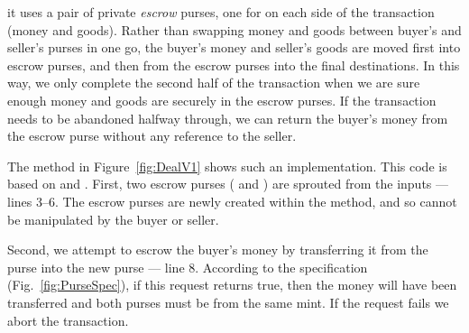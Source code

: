 

%
%


\label{sec:escrows}

it uses a pair of private
\textit{escrow} purses, one for on each side of the transaction
(money and goods).  Rather than swapping money and goods between
buyer's and seller's purses in one go, the buyer's money and seller's
goods are moved first into escrow purses, and then %
from the
escrow purses into the final destinations.  In this way, we only
complete the second half of the transaction when we are sure %
enough money and goods are securely in the escrow purses. If the
transaction needs to be abandoned halfway through,
we can return the buyer's money from the escrow
purse without any reference to the seller.

The  method in Figure~\ref{fig:DealV1} shows
such an implementation.
 This code is %
 based on \cite{miller-esop2013} and  \cite{capeFTfJP14}.
First, two escrow purses ( and
) are sprouted from the inputs --- lines 3--6. The escrow
purses are newly created within the method, and so
cannot be manipulated by the buyer or seller.

Second, we attempt to escrow the buyer's money by transferring it from
the  purse into the new  purse ---
line 8.  According to the specification (Fig.~\ref{fig:PurseSpec}),
if this %
request returns true, then the money will have been transferred and
both purses must be from the same mint.  If the
request %
fails we abort the transaction.


